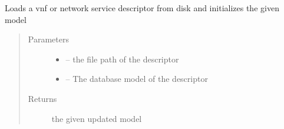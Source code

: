 \documentclass[letterpaper,10pt,english]{sphinxmanual}
\begin{document}

\begin{fulllineitems}
\label{_source/son_editor.util:son_editor.util.descriptorutil.get_schema}
\end{fulllineitems}


\begin{fulllineitems}
\label{_source/son_editor.util:son_editor.util.descriptorutil.get_schemas}
\end{fulllineitems}


\begin{fulllineitems}
\label{_source/son_editor.util:son_editor.util.descriptorutil.load_ns_vnf_from_disk}
Loads a vnf or network service descriptor from disk and initializes the given model
\begin{quote}\begin{description}
\item[{Parameters}] \leavevmode\begin{itemize}
\item {} 
 -- the file path of the descriptor

\item {} 
 -- The database  model of the descriptor

\end{itemize}

\item[{Returns}] \leavevmode
the given updated model

\end{description}\end{quote}

\end{fulllineitems}

\end{document}
